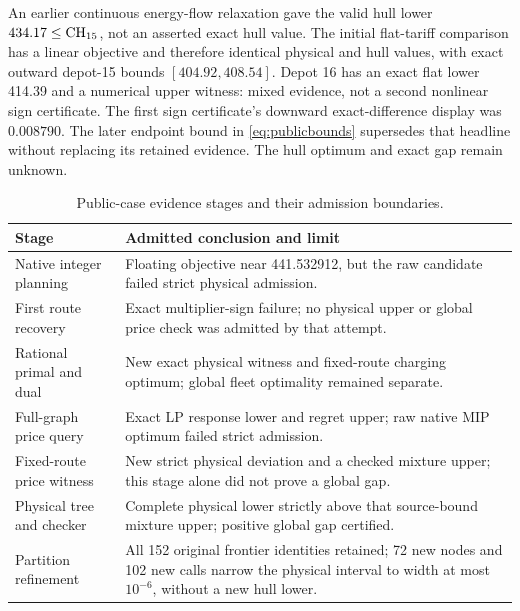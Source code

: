 An earlier continuous energy-flow relaxation gave the valid hull lower
$434.17\le\mathrm{CH}_{15}$, not an asserted exact hull value. The initial
flat-tariff comparison has a linear objective and therefore identical
physical and hull values, with exact outward depot-15 bounds
$[404.92,408.54]$. Depot 16 has an exact flat lower 414.39 and a numerical
upper witness: mixed evidence, not a second nonlinear sign certificate.
The first sign certificate's downward exact-difference display was
$0.008790$. The later endpoint bound in \eqref{eq:publicbounds} supersedes
that headline without replacing its retained evidence. The hull optimum
and exact gap remain unknown.
\begin{table}[htbp]
\centering
\caption{Public-case evidence stages and their admission boundaries.}
\label{tab:publichistory}
\begin{tabular}{lp{}}
\toprule
Stage & Admitted conclusion and limit\\
\midrule
Native integer planning & Floating objective near 441.532912, but the raw
candidate failed strict physical admission.\\
First route recovery & Exact multiplier-sign failure; no physical
upper or global price check was admitted by that attempt.\\
Rational primal and dual & New exact physical witness and fixed-route
charging optimum; global fleet optimality remained separate.\\
Full-graph price query & Exact LP response lower and regret upper;
raw native MIP optimum failed strict admission.\\
Fixed-route price witness & New strict physical deviation and a checked
mixture upper; this stage alone did not prove a global gap.\\
Physical tree and checker & Complete physical lower strictly above
that source-bound mixture upper; positive global gap certified.\\
Partition refinement & All 152 original frontier identities retained;
72 new nodes and 102 new calls narrow the physical interval to width at most
$10^{-6}$, without a new hull lower.\\
\bottomrule
\end{tabular}
\end{table}
